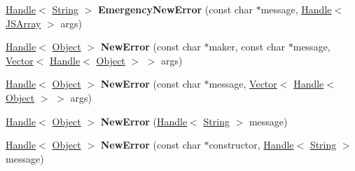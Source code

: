 \begin{DoxyCompactItemize}
\item 
\hypertarget{classv8_1_1internal_1_1_v8___f_i_n_a_l_a61ebb5a84fca68148db0854b80ea637f}{}\hyperlink{classv8_1_1internal_1_1_handle}{Handle}$<$ \hyperlink{classv8_1_1internal_1_1_string}{String} $>$ {\bfseries Emergency\+New\+Error} (const char $\ast$message, \hyperlink{classv8_1_1internal_1_1_handle}{Handle}$<$ \hyperlink{classv8_1_1internal_1_1_j_s_array}{J\+S\+Array} $>$ args)\label{classv8_1_1internal_1_1_v8___f_i_n_a_l_a61ebb5a84fca68148db0854b80ea637f}

\item 
\hypertarget{classv8_1_1internal_1_1_v8___f_i_n_a_l_ac897b8848b961d5c9abee2520a1e9420}{}\hyperlink{classv8_1_1internal_1_1_handle}{Handle}$<$ \hyperlink{classv8_1_1internal_1_1_object}{Object} $>$ {\bfseries New\+Error} (const char $\ast$maker, const char $\ast$message, \hyperlink{classv8_1_1internal_1_1_vector}{Vector}$<$ \hyperlink{classv8_1_1internal_1_1_handle}{Handle}$<$ \hyperlink{classv8_1_1internal_1_1_object}{Object} $>$ $>$ args)\label{classv8_1_1internal_1_1_v8___f_i_n_a_l_ac897b8848b961d5c9abee2520a1e9420}

\item 
\hypertarget{classv8_1_1internal_1_1_v8___f_i_n_a_l_a01c9a274ec58732b6dc32a5ff8a7ebcc}{}\hyperlink{classv8_1_1internal_1_1_handle}{Handle}$<$ \hyperlink{classv8_1_1internal_1_1_object}{Object} $>$ {\bfseries New\+Error} (const char $\ast$message, \hyperlink{classv8_1_1internal_1_1_vector}{Vector}$<$ \hyperlink{classv8_1_1internal_1_1_handle}{Handle}$<$ \hyperlink{classv8_1_1internal_1_1_object}{Object} $>$ $>$ args)\label{classv8_1_1internal_1_1_v8___f_i_n_a_l_a01c9a274ec58732b6dc32a5ff8a7ebcc}

\item 
\hypertarget{classv8_1_1internal_1_1_v8___f_i_n_a_l_a6878e599efcae4fa33c0511d8d28fe55}{}\hyperlink{classv8_1_1internal_1_1_handle}{Handle}$<$ \hyperlink{classv8_1_1internal_1_1_object}{Object} $>$ {\bfseries New\+Error} (\hyperlink{classv8_1_1internal_1_1_handle}{Handle}$<$ \hyperlink{classv8_1_1internal_1_1_string}{String} $>$ message)\label{classv8_1_1internal_1_1_v8___f_i_n_a_l_a6878e599efcae4fa33c0511d8d28fe55}

\item 
\hypertarget{classv8_1_1internal_1_1_v8___f_i_n_a_l_abfad20f61dfbf126a2822b162fdbf248}{}\hyperlink{classv8_1_1internal_1_1_handle}{Handle}$<$ \hyperlink{classv8_1_1internal_1_1_object}{Object} $>$ {\bfseries New\+Error} (const char $\ast$constructor, \hyperlink{classv8_1_1internal_1_1_handle}{Handle}$<$ \hyperlink{classv8_1_1internal_1_1_string}{String} $>$ message)\label{classv8_1_1internal_1_1_v8___f_i_n_a_l_abfad20f61dfbf126a2822b162fdbf248}


\end{DoxyCompactItemize}
